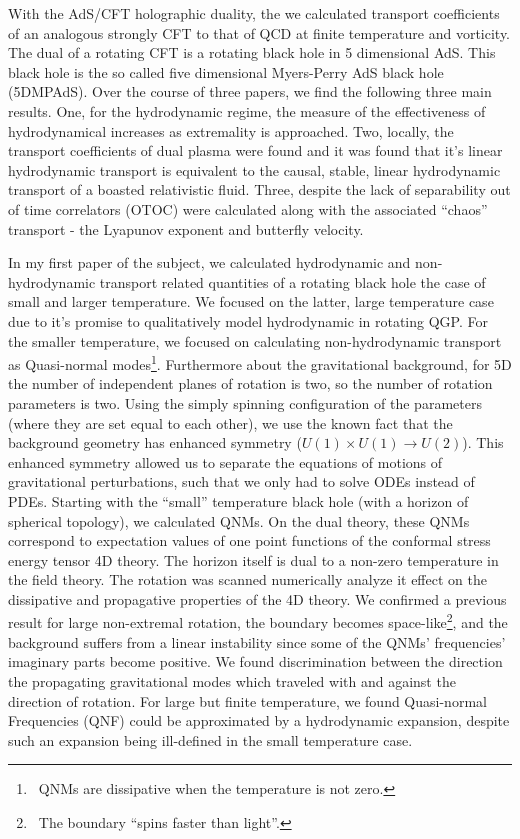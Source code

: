 \documentclass[12pt]{article}
\begin{document}
With the AdS/CFT holographic duality, the we calculated transport coefficients of an analogous strongly CFT to that of QCD at finite temperature and vorticity.
%
The dual of a rotating CFT is a rotating black hole in 5 dimensional AdS. 
%
This black hole is the so called five dimensional Myers-Perry AdS black hole (5DMPAdS).
%
Over the course of three papers, we find the following three main results. 
%
One, for the hydrodynamic regime, the measure of the effectiveness of hydrodynamical increases as extremality is approached.
%
Two, locally, the transport coefficients of dual plasma were found and it was found that it's linear hydrodynamic transport is equivalent to the causal, stable, linear hydrodynamic transport of a boasted relativistic fluid.
%
Three, despite the lack of separability out of time correlators (OTOC) were calculated along with the associated ``chaos'' transport - the Lyapunov exponent and butterfly velocity.
%

In my first paper of the subject, we calculated hydrodynamic and non-hydrodynamic transport related quantities of a rotating black hole the case of small and larger temperature.
%
We focused on the latter, large temperature case due to it's promise to qualitatively model hydrodynamic in rotating QGP.
%
For the smaller temperature, we focused on calculating non-hydrodynamic transport as Quasi-normal modes\footnote{\
  QNMs are dissipative when the temperature is not zero.
}.
%
Furthermore about the gravitational background, for 5D the number of independent planes of rotation is two, so the number of rotation parameters is two.
%
Using the simply spinning configuration of the parameters (where they are set equal to each other), we use the known fact that the background geometry has enhanced symmetry ($U(1)\times U(1) \rightarrow U(2)$).
%
This enhanced symmetry allowed us to separate the equations of motions of gravitational perturbations, such that we only had to solve ODEs instead of PDEs.
%
Starting with the ``small'' temperature black hole (with a horizon of spherical topology), we calculated QNMs.
%
On the dual theory, these QNMs correspond to expectation values of one point functions of the conformal stress energy tensor 4D theory.
%
The horizon itself is dual to a non-zero temperature in the field theory.
%
The rotation was scanned numerically analyze it effect on the dissipative and propagative properties of the 4D theory.
%
We confirmed a previous result for large non-extremal rotation, the boundary becomes space-like\footnote{\
  The boundary ``spins faster than light''.
}, and the background suffers from a linear instability since some of the QNMs' frequencies' imaginary parts become positive.
%
We found discrimination between the direction the propagating gravitational modes which traveled with and against the direction of rotation.
%
For large but finite temperature, we found Quasi-normal Frequencies (QNF) could be approximated by a hydrodynamic expansion, despite such an expansion being ill-defined in the small temperature case.
\end{document}
